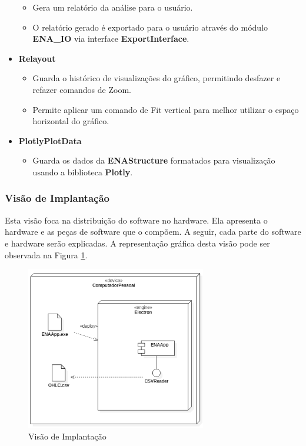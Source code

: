 \documentclass[12pt]{article}
\begin{document}
\begin{itemize}
	\begin{itemize}
		\item Gera um relatório da análise para o usuário.
		\item O relatório gerado é exportado para o usuário através do módulo \textbf{ENA\_IO} via interface \textbf{ExportInterface}.
	\end{itemize}
	\item \textbf{Relayout}
	\begin{itemize}
		\item Guarda o histórico de visualizações do gráfico, permitindo desfazer e refazer comandos de Zoom.
		\item Permite aplicar um comando de Fit vertical para melhor utilizar o espaço horizontal do gráfico.
	\end{itemize}
	\item \textbf{PlotlyPlotData}
	\begin{itemize}
		\item Guarda os dados da \textbf{ENAStructure} formatados para visualização usando a biblioteca \textbf{Plotly}.
	\end{itemize}
\end{itemize}

\subsubsection{Visão de Implantação}

Esta visão foca na distribuição do software no hardware. Ela apresenta o hardware e as
peças de software que o compõem. A seguir, cada parte do software e hardware serão explicadas.
A representação gráfica desta visão pode ser observada na Figura \ref{fig:DeploymentView}.

\begin{figure}[H]
	\centering
	\includegraphics[width=0.7\textwidth]{DeploymentView.png}
	\caption{Visão de Implantação}\label{fig:DeploymentView}
\end{figure}
\end{document}
